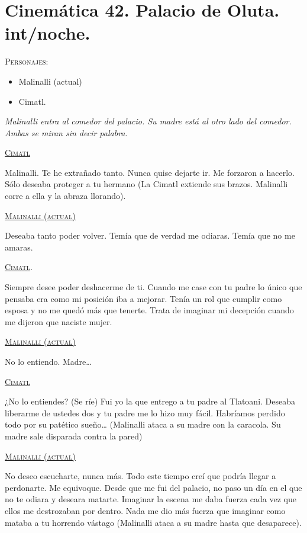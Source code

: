 \section{Cinemática 42. Palacio de Oluta. int/noche. }
\label{Cin:Cinematica42}
 \textsc{Personajes}:
 \begin{itemize}
 \item Malinalli (actual)
 \item Cimatl.
 \end{itemize}
\textit{Malinalli entra al comedor del palacio. Su madre está al otro lado del comedor. Ambas se miran sin decir palabra. }
\begin{center}
\textsc{\underline{Cimatl}}
\\
\par
Malinalli. Te he extrañado tanto. Nunca quise dejarte ir. Me forzaron a hacerlo. Sólo deseaba proteger a tu hermano (La Cimatl extiende sus brazos. Malinalli corre a ella y la abraza llorando).
\\
\par
\textsc{\underline{Malinalli (actual)}}
\\
\par
Deseaba tanto poder volver. Temía que de verdad me odiaras. Temía que no me amaras.
\\
\par
\textsc{\underline{Cimatl}}.
\\
\par
Siempre desee poder deshacerme de ti. Cuando me case con tu padre lo único que pensaba era como mi posición iba a mejorar. Tenía un rol que cumplir como esposa y no me quedó más que tenerte. Trata de imaginar mi decepción cuando me dijeron que naciste mujer. 
\\
\par
\textsc{\underline{Malinalli (actual)}}
\\
\par
No lo entiendo. Madre…
\\
\par
\textsc{\underline{Cimatl}}
\\
\par
¿No lo entiendes? (Se ríe) Fui yo la que entrego a tu padre al Tlatoani. Deseaba liberarme de ustedes dos y tu padre me lo hizo muy fácil. Habríamos perdido todo por su patético sueño… (Malinalli ataca a su madre con la caracola. Su madre sale disparada contra la pared)
\\
\par
\textsc{\underline{Malinalli (actual)}}
\\
\par
No deseo escucharte, nunca más. Todo este tiempo creí que podría llegar a perdonarte. Me equivoque. Desde que me fui del palacio, no paso un día en el que no te odiara y deseara matarte. Imaginar la escena me daba fuerza cada vez que ellos me destrozaban por dentro. Nada me dio más fuerza que imaginar como mataba a tu horrendo vástago (Malinalli ataca a su madre hasta que desaparece).   
\end{center}